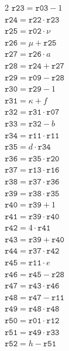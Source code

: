 \documentclass[10pt]{article}
\begin{document}
\begin{multicols}{2}
\(\mathtt{r23} = \mathtt{r03} - 1\)\\
\(\mathtt{r24} = \mathtt{r22} \cdot \mathtt{r23}\)\\
\(\mathtt{r25} = \mathtt{r02} \cdot \nu\)\\
\(\mathtt{r26} = \mu + \mathtt{r25}\)\\
\(\mathtt{r27} = \mathtt{r26} \cdot a\)\\
\(\mathtt{r28} = \mathtt{r24} + \mathtt{r27}\)\\
\(\mathtt{r29} = \mathtt{r09} - \mathtt{r28}\)\\
\(\mathtt{r30} = \mathtt{r29} - 1\)\\
\(\mathtt{r31} = \kappa + f\)\\
\(\mathtt{r32} = \mathtt{r31} \cdot \mathtt{r07}\)\\
\(\mathtt{r33} = \mathtt{r32} - b\)\\
\(\mathtt{r34} = \mathtt{r11} \cdot \mathtt{r11}\)\\
\(\mathtt{r35} = d \cdot \mathtt{r34}\)\\
\(\mathtt{r36} = \mathtt{r35} \cdot \mathtt{r20}\)\\
\(\mathtt{r37} = \mathtt{r13} \cdot \mathtt{r16}\)\\
\(\mathtt{r38} = \mathtt{r37} \cdot \mathtt{r36}\)\\
\columnbreak
\(\mathtt{r39} = \mathtt{r38} \cdot \mathtt{r35}\)\\
\(\mathtt{r40} = \mathtt{r39} + 1\)\\
\(\mathtt{r41} = \mathtt{r39} \cdot \mathtt{r40}\)\\
\(\mathtt{r42} = 4 \cdot \mathtt{r41}\)\\
\(\mathtt{r43} = \mathtt{r39} + \mathtt{r40}\)\\
\(\mathtt{r44} = \mathtt{r37} \cdot \mathtt{r42}\)\\
\(\mathtt{r45} = \mathtt{r11} \cdot e\)\\
\(\mathtt{r46} = \mathtt{r45} - \mathtt{r28}\)\\
\(\mathtt{r47} = \mathtt{r43} \cdot \mathtt{r46}\)\\
\(\mathtt{r48} = \mathtt{r47} - \mathtt{r11}\)\\
\(\mathtt{r49} = \mathtt{r48} \cdot \mathtt{r48}\)\\
\(\mathtt{r50} = \mathtt{r01} \cdot \mathtt{r12}\)\\
\(\mathtt{r51} = \mathtt{r49} \cdot \mathtt{r33}\)\\
\(\mathtt{r52} = h - \mathtt{r51}\)\\

\end{multicols}
\end{document}
